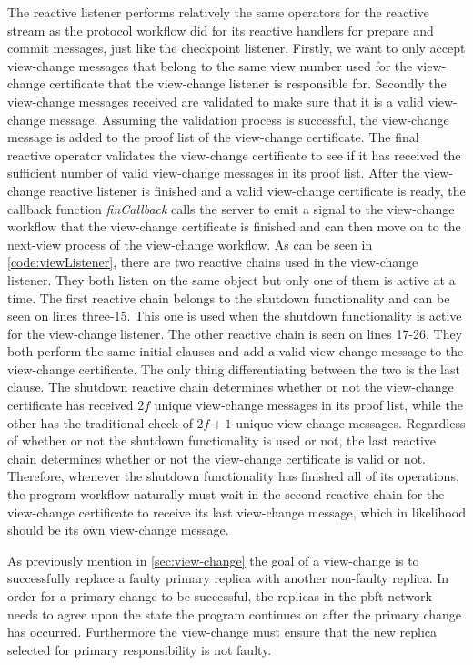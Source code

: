 The reactive listener performs relatively the same operators for the reactive stream as the protocol workflow did for its reactive handlers for prepare and commit messages, just like the checkpoint listener. Firstly, we want to only accept view-change messages that belong to the same view number used for the view-change certificate that the view-change listener is responsible for. Secondly the view-change messages received are validated to make sure that it is a valid view-change message. Assuming the validation process is successful, the view-change message is added to the proof list of the view-change certificate. The final reactive operator validates the view-change certificate to see if it has received the sufficient number of valid view-change messages in its proof list. After the view-change reactive listener is finished and a valid view-change certificate is ready, the callback function \emph{finCallback} calls the server to emit a signal to the view-change workflow that the view-change certificate is finished and can then move on to the next-view process of the view-change workflow. As can be seen in \autoref{code:viewListener}, there are two reactive chains used in the view-change listener. They both listen on the same  object but only one of them is active at a time. The first reactive chain belongs to the shutdown functionality and can be seen on lines three-15. This one is used when the shutdown functionality is active for the view-change listener. The other reactive chain is seen on lines 17-26. They both perform the same initial  clauses and add a valid view-change message to the view-change certificate. The only thing differentiating between the two is the last  clause. The shutdown reactive chain determines whether or not the view-change certificate has received $2f$ unique view-change messages in its proof list, while the other has the traditional check of $2f+1$ unique view-change messages. Regardless of whether or not the shutdown functionality is used or not, the last reactive chain determines whether or not the view-change certificate is valid or not. Therefore, whenever the shutdown functionality has finished all of its operations, the program workflow naturally must wait in the second reactive chain for the view-change certificate to receive its last view-change message, which in likelihood should be its own view-change message. 


\iffalse
As previously mention in \autoref{sec:view-change} the goal of a view-change is to successfully replace a faulty primary replica with another non-faulty replica. In order for a primary change to be successful, the replicas in the \ac{pbft} network needs to agree upon the state the program continues on after the primary change has occurred. Furthermore the view-change must ensure that the new replica selected for primary responsibility is not faulty. 

